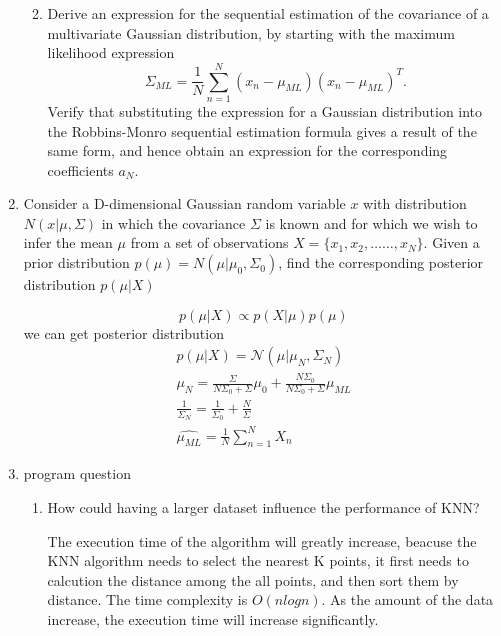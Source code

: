 \documentclass[a4paper]{article}
\begin{document}
\begin{enumerate}
\begin{enumerate}
\begin{solution}
			\end{solution}
			\item
			Derive an expression for the sequential estimation of the covariance of a multivariate Gaussian distribution, by starting with the maximum likelihood expression
			$$
			\Sigma_{ML}=\frac{1}{N}\sum_{n=1}^{N}(x_n-\mu_{ML})(x_n-\mu_{ML})^{T}.
			$$
			Verify that substituting the expression for a Gaussian distribution into the Robbins-Monro sequential estimation formula gives a result of the same form, and hence obtain an expression for the corresponding coefficients $a_N$.
		\end{enumerate}
		\item
		Consider a D-dimensional Gaussian random variable $x$ with distribution $N(x|\mu,\Sigma)$ in which the covariance $\Sigma$ is known and for which we wish to infer the mean $\mu$ from a set of observations $X=\{x_1,x_2,……,x_N\}$. Given a prior distribution $p(\mu)=N(\mu|\mu_0,\Sigma_0)$, find the corresponding posterior distribution $p(\mu|X)$
		\begin{solution}
			\begin{equation*}
				p(\mu|X)\propto p(X|\mu)p(\mu)
			\end{equation*}
			we can get posterior distribution
			\begin{equation*}
			\begin{split}
				p(\mu|X)=\mathcal{N}(\mu|\mu_N,\Sigma_N)\\
				\mu_N=\frac{\Sigma}{N\Sigma_0+\Sigma}\mu_0+\frac{N\Sigma_0}{N\Sigma_0+\Sigma}\mu_{ML}\\
				\frac{1}{\Sigma_N}=\frac{1}{\Sigma_0}+\frac{N}{\Sigma}\\
				\hat{\mu_{ML}}=\frac{1}{N}\sum_{n=1}^{N}X_n
			\end{split}
			\end{equation*}
		\end{solution}
		\item 
		program question
		\begin{enumerate}
			\item
			How could having a larger dataset influence the performance of KNN?
			\begin{solution}
			The execution time of the algorithm will greatly increase, beacuse the KNN algorithm needs to select the nearest K points, it first needs to calcution the distance among the all points, and then sort them by distance. The time complexity is $O(nlogn)$. As the amount of the data increase, the execution time will increase significantly.
			\end{solution}

\end{enumerate}
\end{enumerate}
\end{document}
